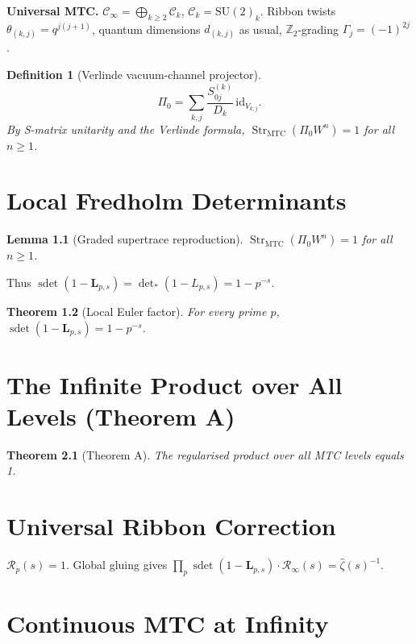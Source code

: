 \documentclass[11pt, oneside]{book}
\newtheorem{theorem}{Theorem}[chapter]
\newtheorem{lemma}[theorem]{Lemma}
\newtheorem{definition}[theorem]{Definition}
\begin{document}
\textbf{Universal MTC.} \(\mathcal{C}_\infty=\bigoplus_{k\ge2}\mathcal{C}_k\), \(\mathcal{C}_k=\mathrm{SU}(2)_k\). Ribbon twists \(\theta_{(k,j)}=q^{j(j+1)}\), quantum dimensions \(d_{(k,j)}\) as usual, \(\mathbb{Z}_2\)-grading \(\Gamma_j=(-1)^{2j}\).

\begin{definition}[Verlinde vacuum-channel projector]
\[
\Pi_0=\sum_{k,j}\frac{S_{0j}^{(k)}}{D_k}\,\mathrm{id}_{V_{k,j}}.
\]
By S-matrix unitarity and the Verlinde formula, \(\operatorname{Str}_{\mathrm{MTC}}(\Pi_0 W^n)=1\) for all \(n\ge1\).
\end{definition}

\chapter{Local Fredholm Determinants}
\label{ch:fredholm}

\begin{lemma}[Graded supertrace reproduction]
\(\operatorname{Str}_{\mathrm{MTC}}(\Pi_0 W^n)=1\) for all \(n\ge1\).
\end{lemma}

Thus \(\operatorname{sdet}(1-\mathbf{L}_{p,s})=\det_*(1-L_{p,s})=1-p^{-s}\).

\begin{theorem}[Local Euler factor]
For every prime \(p\), \(\operatorname{sdet}(1-\mathbf{L}_{p,s}) = 1-p^{-s}\).
\end{theorem}

\chapter{The Infinite Product over All Levels (Theorem A)}
\label{ch:theoremA}

\begin{theorem}[Theorem A]
The regularised product over all MTC levels equals 1.
\end{theorem}

\chapter{Universal Ribbon Correction}
\label{ch:ribbon}

\(\mathcal{R}_p(s)=1\). Global gluing gives \(\prod_p \operatorname{sdet}(1-\mathbf{L}_{p,s})\cdot\mathcal{R}_\infty(s)=\hat{\zeta}(s)^{-1}\).

\chapter{Continuous MTC at Infinity}
\label{ch:archimedean}
\end{document}
